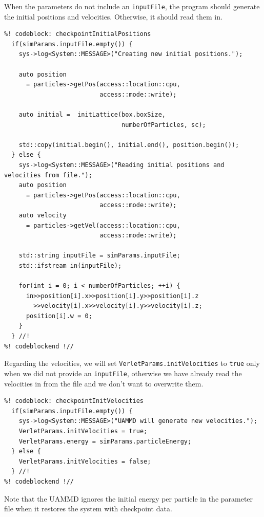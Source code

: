 When the parameters do not include an \texttt{inputFile}, the program should 
generate the initial positions and velocities. Otherwise, it should read them 
in.
\begin{lstlisting}
%! codeblock: checkpointInitialPositions
  if(simParams.inputFile.empty()) {
    sys->log<System::MESSAGE>("Creating new initial positions.");

    auto position
      = particles->getPos(access::location::cpu,
                          access::mode::write);

    auto initial =  initLattice(box.boxSize,
                                numberOfParticles, sc);

    std::copy(initial.begin(), initial.end(), position.begin());
  } else {
    sys->log<System::MESSAGE>("Reading initial positions and velocities from file.");
    auto position
      = particles->getPos(access::location::cpu,
                          access::mode::write);
    auto velocity
      = particles->getVel(access::location::cpu,
                          access::mode::write);

    std::string inputFile = simParams.inputFile;
    std::ifstream in(inputFile);

    for(int i = 0; i < numberOfParticles; ++i) {
      in>>position[i].x>>position[i].y>>position[i].z
        >>velocity[i].x>>velocity[i].y>>velocity[i].z;
      position[i].w = 0;
    }
  } //!
%! codeblockend !//
\end{lstlisting}

Regarding the velocities, we will set \texttt{VerletParams.initVelocities} to 
\texttt{true} only when we did not provide an \texttt{inputFile}, otherwise we 
have already read the velocities in from the file and we don't want to 
overwrite them.
\begin{lstlisting}
%! codeblock: checkpointInitVelocities
  if(simParams.inputFile.empty()) {
    sys->log<System::MESSAGE>("UAMMD will generate new velocities.");
    VerletParams.initVelocities = true;
    VerletParams.energy = simParams.particleEnergy;
  } else {
    VerletParams.initVelocities = false;
  } //!
%! codeblockend !//
\end{lstlisting}
Note that the UAMMD ignores the initial energy per particle in the parameter 
file when it restores the system with checkpoint data.

